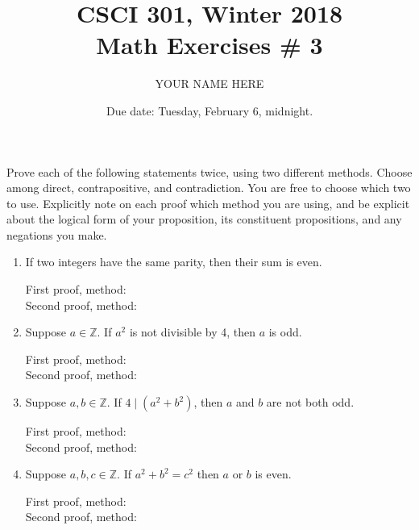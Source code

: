 \documentclass{article}
\title{CSCI 301, Winter 2018\\Math Exercises \# 3}
\author{YOUR NAME HERE}
\date{Due date:  Tuesday, February 6, midnight.}
\begin{document}
\maketitle

Prove each of the following statements twice, using two different
methods.  Choose among direct, contrapositive, and contradiction.  You
are free to choose which two to use.  Explicitly note on each proof which
method you are using, and be explicit about the logical form of your
proposition, its constituent propositions, and any negations you
make.


\begin{enumerate}
\item If two integers have the same parity, then their sum is even.
  \begin{description}
    \item[First proof, method:]
    \item[Second proof, method:]
  \end{description}
  
\item Suppose $a\in\mathbb{Z}$.  If $a^2$ is not divisible by 4,
  then $a$ is odd.
  \begin{description}
    \item[First proof, method:]
    \item[Second proof, method:]
  \end{description}

\item Suppose $a,b\in\mathbb{Z}$.  If $4\mid (a^2+b^2)$, then $a$ and
  $b$ are not both odd.
  \begin{description}
    \item[First proof, method:]
    \item[Second proof, method:]
  \end{description}

\item Suppose $a,b,c\in\mathbb{Z}$.  If $a^2+b^2=c^2$ then $a$ or
  $b$ is even.
  \begin{description}
    \item[First proof, method:]
    \item[Second proof, method:]
  \end{description}
  
\end{enumerate}
\end{document}
